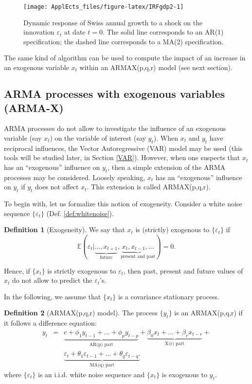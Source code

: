 \documentclass[
  12pt,
]{book}
\theoremstyle{definition}
\newtheorem{definition}{Definition}[chapter]
\theoremstyle{definition}
\theoremstyle{definition}
\theoremstyle{definition}
\theoremstyle{remark}
\begin{document}
\begin{figure}
\texttt{[image: ApplEcts\_files/figure-latex/IRFgdp2-1]} \caption{Dynamic response of Swiss annual growth to a shock on the innovation $\varepsilon_t$ at date $t=0$. The solid line corresponds to an AR(1) specification; the dashed line corresponds to a MA(2) specification.}\label{fig:IRFgdp2}
\end{figure}

The same kind of algorithm can be used to compute the impact of an increase in an exogenous variable \(x_t\) within an ARMAX(p,q,r) model (see next section).

\hypertarget{ARMAIRF}{%
\subsection{ARMA processes with exogenous variables (ARMA-X)}\label{ARMAIRF}}

ARMA processes do not allow to investigate the influence of an exogenous variable (say \(x_t\)) on the variable of interest (say \(y_t\)). When \(x_t\) and \(y_t\) have reciprocal influences, the Vector Autoregressive (VAR) model may be used (this tools will be studied later, in Section \ref{VAR}). However, when one suspects that \(x_t\) has an ``exogenous'' influence on \(y_t\), then a simple extension of the ARMA processes may be considered. Loosely speaking, \(x_t\) has an ``exogenous'' influence on \(y_t\) if \(y_t\) does not affect \(x_t\). This extension is called ARMAX(p,q,r).

To begin with, let us formalize this notion of exogeneity. Consider a white noise sequence \(\{\varepsilon_t\}\) (Def. \ref{def:whitenoise}).

\begin{definition}[Exogeneity]
\protect\hypertarget{def:exogeneity}{}\label{def:exogeneity}We say that \(x_t\) is (strictly) exogenous to \(\{\varepsilon_t\}\) if
\[
\mathbb{E}(\varepsilon_t|\underbrace{\dots,x_{t+1}}_{\mbox{future}},\underbrace{x_t,x_{t-1},\dots}_{\mbox{present and past}}) = 0.
\]
\end{definition}

Hence, if \(\{x_t\}\) is strictly exogenous to \(\varepsilon_t\), then past, present and future values of \(x_t\) do not allow to predict the \(\varepsilon_t\)'s.

In the following, we assume that \(\{x_t\}\) is a covariance stationary process.

\begin{definition}[ARMAX(p,q,r) model]
\protect\hypertarget{def:ARMAX}{}\label{def:ARMAX}The process \(\{y_t\}\) is an ARMAX(p,q,r) if it follows a difference equation:
\begin{eqnarray}
y_t &=& \underbrace{c + \phi_1 y_{t-1} + \dots + \phi_p y_{t-p}}_{\mbox{AR(p) part}} + \underbrace{\beta_0 x_t + \dots + \beta_{r} x_{t-r}}_{\mbox{X(r) part}} + \nonumber \\
&&\underbrace{\varepsilon_t + \theta_1\varepsilon_{t-1}+\dots +\theta_{q}\varepsilon_{t-q}.}_{\mbox{MA(q) part}} \label{eq:DLM}
\end{eqnarray}
where \(\{\varepsilon_t\}\) is an i.i.d. white noise sequence and \(\{x_t\}\) is exogenous to \(y_t\).
\end{definition}
\end{document}
